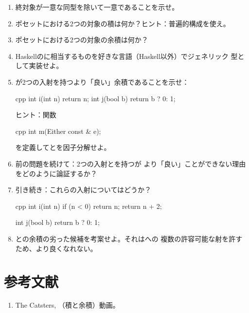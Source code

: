 \begin{enumerate}
  \tightlist
  \item
        終対象が一意な同型を除いて一意であることを示せ。
  \item
        ポセットにおける2つの対象の積は何か？ヒント：普遍的構成を使え。
  \item
        ポセットにおける2つの対象の余積は何か？
  \item
        Haskellのに相当するものを好きな言語（Haskell以外）でジェネリック
        型として実装せよ。
  \item
        が2つの入射を持つより「良い」余積であることを示せ：

        \begin{snip}{cpp}
int i(int n) { return n; }
int j(bool b) { return b ? 0: 1; }
\end{snip}

        ヒント：関数

        \begin{snip}{cpp}
int m(Either const & e);
\end{snip}

        を定義してとを因子分解せよ。
  \item
        前の問題を続けて：2つの入射とを持つが
        より「良い」ことができない理由をどのように論証するか？
  \item
        引き続き：これらの入射についてはどうか？

        \begin{snip}{cpp}
int i(int n) {
    if (n < 0) return n;
    return n + 2;
}

int j(bool b) { return b ? 0: 1; }
\end{snip}
  \item
        との余積の劣った候補を考案せよ。それはへの
        複数の許容可能な射を許すため、より良くなれない。
\end{enumerate}

\section{参考文献}

\begin{enumerate}
  \tightlist
  \item
        The Catsters,
        （積と余積）動画。
\end{enumerate}

